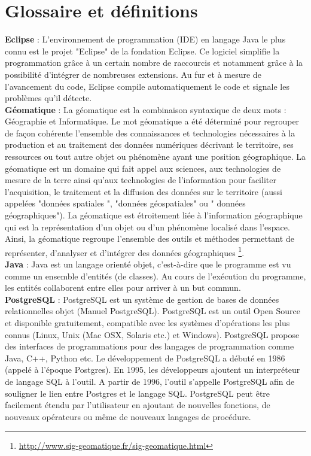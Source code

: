\chapter{Glossaire et définitions}
\label{Glossaire}


\textbf{Eclipse} : L'environnement de programmation (IDE) en langage Java le plus connu est le projet "Eclipse" de la fondation Eclipse. Ce logiciel simplifie la programmation grâce à un certain nombre de raccourcis et notamment grâce à la possibilité d'intégrer de nombreuses extensions. Au fur et à mesure de l'avancement du code, Eclipse compile automatiquement le code et signale les problèmes qu'il détecte.\\

\textbf{Géomatique} : La géomatique est la combinaison syntaxique de deux mots : Géographie et Informatique.
Le mot géomatique a été déterminé pour regrouper de façon cohérente l’ensemble des connaissances et technologies nécessaires à la production et au traitement des données numériques décrivant le territoire, ses ressources ou tout autre objet ou phénomène ayant une position géographique.
La géomatique est un domaine qui fait appel aux sciences, aux technologies de mesure de la terre ainsi qu’aux technologies de l’information pour faciliter l’acquisition, le traitement et la diffusion des données sur le territoire (aussi appelées "données spatiales ", "données géospatiales" ou " données géographiques").
La géomatique est étroitement liée à l’information géographique qui est la représentation d’un objet ou d’un phénomène localisé dans l’espace.
Ainsi, la géomatique regroupe l’ensemble des outils et méthodes permettant de représenter, d’analyser et d’intégrer des données géographiques
\footnote{\url{http://www.sig-geomatique.fr/sig-geomatique.html}}.\\

\textbf{Java} : Java est un langage orienté objet, c'est-à-dire que le programme est vu comme un ensemble d'entités (de classes). Au cours de l'exécution du programme, les entités collaborent entre elles pour arriver à un but commun.\\

\textbf{PostgreSQL} : PostgreSQL est un système de gestion de bases de données relationnelles objet (Manuel PostgreSQL). PostgreSQL est un outil Open Source et disponible gratuitement, compatible avec les systèmes d'opérations les plus connus (Linux, Unix (Mac OSX, Solaris etc.) et Windows). PostgreSQL propose des interfaces de programmations pour des langages de programmation comme Java, C++, Python etc.
Le développement de PostgreSQL a débuté en 1986 (appelé à l'époque Postgres). En 1995, les développeurs ajoutent un interpréteur de langage SQL à l'outil. A partir de 1996, l'outil s'appelle PostgreSQL afin de souligner le lien entre Postgres et le langage SQL. PostgreSQL peut être facilement étendu par l'utilisateur en ajoutant de nouvelles fonctions, de nouveaux opérateurs ou même de nouveaux langages de procédure.\\

